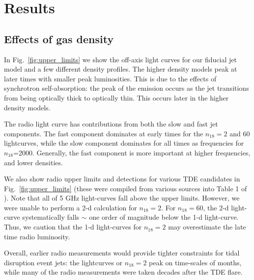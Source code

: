 \documentclass[usenatbib,fleqn]{mnras}
\begin{document}
\section{Results}
\label{sec:results}

\subsection{Effects of gas density}

In Fig.~\ref{fig:upper_limits} we show the off-axis light curves for
our fiducial jet model and a few different density profiles.
The higher density models peak at later times with smaller peak
luminosities.  This is due to the effects of synchrotron
self-absorption: the peak of the emission occurs as the jet
transitions from being optically thick to optically thin. This occurs
later in the higher density models.

The radio light curve has contributions from both the slow and fast
jet components. The fast component dominates at early times for the
$n_{18}=2$ and 60 lightcurves, while the slow component dominates for
all times as frequencies for $n_{18}$=2000. Generally, the fast
component is more important at higher frequencies, and lower
densities. 

We also show radio upper limits and detections for various TDE
candidates in Fig.~\ref{fig:upper_limits} (these were compiled from
various sources into Table 1 of \citealt{Mimica+2015}). Note that all
of 5 GHz light-curves fall above the upper limits. However, we were
unable to perform a 2-d calculation for $n_{18}=2$.  For $n_{18}=60$,
the 2-d light-curve systematically falls $\sim$ one order of magnitude
below the 1-d light-curve. Thus, we caution that the 1-d light-curves
for $n_{18}=2$ may overestimate the late time radio luminosity. 

Overall, earlier radio measurements would provide tighter constraints
for tidal disruption event jets: the lightcurves or $n_{18}=2$ peak on
time-scales of months, while many of the radio measurements were taken
decades after the TDE flare.
\end{document}
